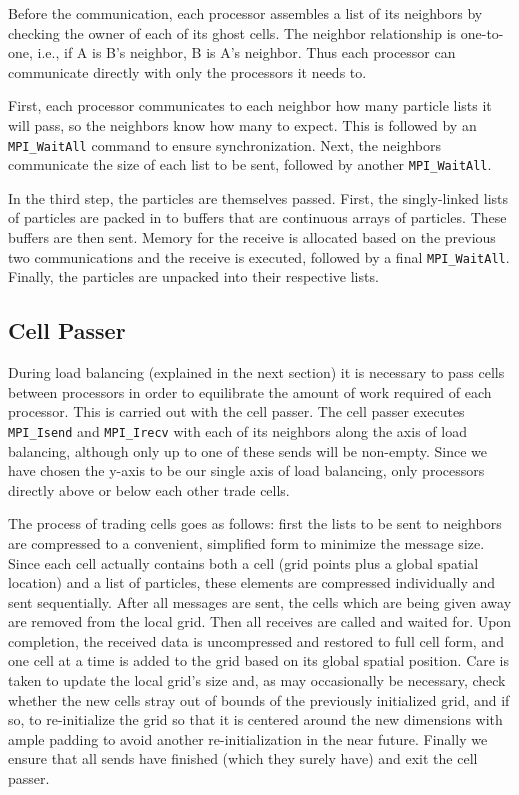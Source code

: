 \documentclass[]{article}
\begin{document}
Before the communication, each processor assembles a list of its neighbors by checking the owner of each of its ghost cells.  The neighbor relationship is one-to-one, i.e., if A is B's neighbor, B is A's neighbor.  Thus each processor can communicate directly with only the processors it needs to.

First, each processor communicates to each neighbor how many particle lists it will pass, so the neighbors know how many to expect.  This is followed by an \texttt{MPI\_WaitAll} command to ensure synchronization.  Next, the neighbors communicate the size of each list to be sent, followed by another \texttt{MPI\_WaitAll}.

In the third step, the particles are themselves passed.  First, the singly-linked lists of particles are packed in to buffers that are continuous arrays of particles.  These buffers are then sent.  Memory for the receive is allocated based on the previous two communications and the receive is executed, followed by a final \texttt{MPI\_WaitAll}.  Finally, the particles are unpacked into their respective lists.

\subsection{Cell Passer}
During load balancing (explained in the next section) it is necessary to pass cells between processors in order to equilibrate the amount of work required of each processor. This is carried out with the cell passer. The cell passer executes \texttt{MPI\_Isend} and \texttt{MPI\_Irecv} with each of its neighbors along the axis of load balancing, although only up to one of these sends will be non-empty. Since we have chosen the y-axis to be our single axis of load balancing, only processors directly above or below each other trade cells. 

The process of trading cells goes as follows: first the lists to be sent to neighbors are compressed to a convenient, simplified form to minimize the message size. Since each cell actually contains both a cell (grid points plus a global spatial location) and a list of particles, these elements are compressed individually and sent sequentially. After all messages are sent, the cells which are being given away are removed from the local grid. Then all receives are called and waited for. Upon completion, the received data is uncompressed and restored to full cell form, and one cell at a time is added to the grid based on its global spatial position. Care is taken to update the local grid's size and, as may occasionally be necessary, check whether the new cells stray out of bounds of the previously initialized grid, and if so, to re-initialize the grid so that it is centered around the new dimensions with ample padding to avoid another re-initialization in the near future. Finally we ensure that all sends have finished (which they surely have) and exit the cell passer.
\end{document}
